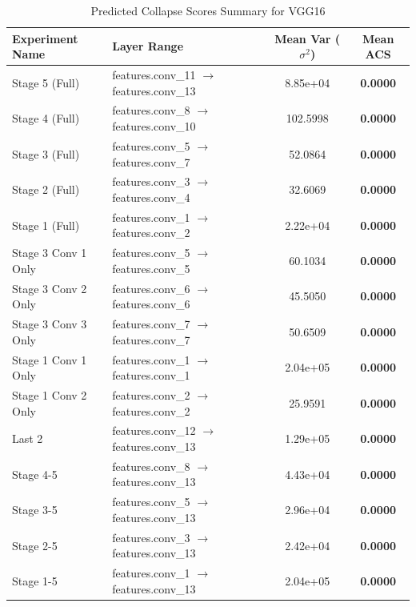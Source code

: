 \begin{table}[h]
\caption{Predicted Collapse Scores Summary for VGG16}
\label{tab:acs_summary_vgg16}
\begin{tabular}{llcc}
\toprule
Experiment Name & Layer Range & Mean Var ($\sigma^2$) & Mean ACS \\
\midrule
Stage 5 (Full) & features.conv\_11 $\to$ features.conv\_13 & 8.85e+04 & \textbf{0.0000} \\
Stage 4 (Full) & features.conv\_8 $\to$ features.conv\_10 & 102.5998 & \textbf{0.0000} \\
Stage 3 (Full) & features.conv\_5 $\to$ features.conv\_7 & 52.0864 & \textbf{0.0000} \\
Stage 2 (Full) & features.conv\_3 $\to$ features.conv\_4 & 32.6069 & \textbf{0.0000} \\
Stage 1 (Full) & features.conv\_1 $\to$ features.conv\_2 & 2.22e+04 & \textbf{0.0000} \\
Stage 3 Conv 1 Only & features.conv\_5 $\to$ features.conv\_5 & 60.1034 & \textbf{0.0000} \\
Stage 3 Conv 2 Only & features.conv\_6 $\to$ features.conv\_6 & 45.5050 & \textbf{0.0000} \\
Stage 3 Conv 3 Only & features.conv\_7 $\to$ features.conv\_7 & 50.6509 & \textbf{0.0000} \\
Stage 1 Conv 1 Only & features.conv\_1 $\to$ features.conv\_1 & 2.04e+05 & \textbf{0.0000} \\
Stage 1 Conv 2 Only & features.conv\_2 $\to$ features.conv\_2 & 25.9591 & \textbf{0.0000} \\
Last 2 & features.conv\_12 $\to$ features.conv\_13 & 1.29e+05 & \textbf{0.0000} \\
Stage 4-5 & features.conv\_8 $\to$ features.conv\_13 & 4.43e+04 & \textbf{0.0000} \\
Stage 3-5 & features.conv\_5 $\to$ features.conv\_13 & 2.96e+04 & \textbf{0.0000} \\
Stage 2-5 & features.conv\_3 $\to$ features.conv\_13 & 2.42e+04 & \textbf{0.0000} \\
Stage 1-5 & features.conv\_1 $\to$ features.conv\_13 & 2.04e+05 & \textbf{0.0000} \\
\bottomrule
\end{tabular}
\end{table}

